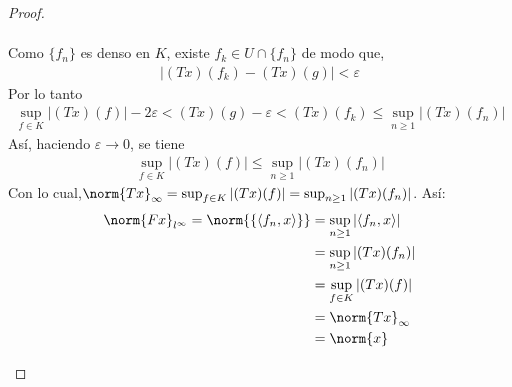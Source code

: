 \begin{proof}
\begin{enumerate}
\begin{align*}
    \end{align*}
    Como $\{f_n\}$ es denso en $K$, existe $f_k \in U\cap \{f_n\}$ de modo que,
    \begin{align*}
        |(Tx)(f_k)-(Tx)(g)|<\varepsilon
    \end{align*}
    Por lo tanto
    \begin{align*}
    \sup_{f\in K}|(Tx)(f)|-2\varepsilon<(Tx)(g)-\varepsilon<(Tx)(f_k)\leq \sup_{n\geq 1}|(Tx)(f_n)|
    \end{align*}
    Así, haciendo $\varepsilon \to 0$, se tiene 
    \begin{align*}
    \sup_{f\in K}|(Tx)(f)|\leq \sup_{n\geq 1}|(Tx)(f_n)| 
    \end{align*}
    Con lo cual,$\norm{Tx}_{\infty}=\sup_{f\in K}|(Tx)(f)|=\sup_{n\geq 1}|(Tx)(f_n)|$. Así:
    \begin{align*}
        \norm{Fx}_{l^{\infty}}=\norm{\{\langle f_n,x\rangle\}}&=\sup_{n\geq 1}|\langle f_n,x\rangle|\\&=\sup_{n\geq1}|(Tx)(f_n)|\\&=\sup_{f\in K}|(Tx)(f)|\\&=\norm{Tx}_{\infty}\\&=\norm{x}
    \end{align*}
    \end{enumerate}

\end{proof}